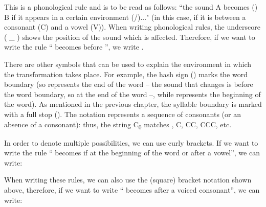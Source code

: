 \begin{refsection}
\ea  {} \z


This is a phonological rule and is to be read as follows: ``the sound A becomes (\rightarrow) B if it appears in a certain environment (/)..." (in this
case, if it is between a consonant (C) and a vowel (V)). When writing phonological rules, the underscore ( \_ ) shows the position of the sound which is affected. Therefore, if we want to write the rule
`` becomes  before '', we write .

There are other symbols that can be used to explain the environment in which the transformation takes place. For example, the hash sign (\OlympiadPhonRule{\#}) marks the word boundary (so \OlympiadPhonRule{\_ \#} represents the end of the word – the sound that changes is before the word boundary, so at the end of the word --, while \OlympiadPhonRule{\# \_} represents the beginning of the word). As mentioned in the previous chapter, the syllable boundary is marked with a full stop (). The notation  represents a sequence of consonants (or an absence of a consonant): thus, the string C\textsubscript{0} matches , C, CC, CCC, etc.

In order to denote multiple possibilities, we can use curly brackets. If we want to write the rule `` becomes  if at the beginning of the word or after a vowel'', we can write:

\begin{center}
\end{center}

When writing these rules, we can also use the (square) bracket notation shown above, therefore, if we want to write `` becomes  after a voiced consonant'', we can write:


\begin{center}
\end{center}



\end{refsection}
